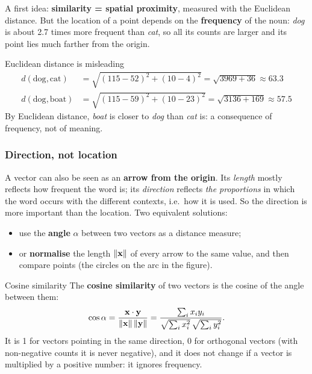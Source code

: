 A first idea: \textbf{similarity = spatial proximity}, measured with the Euclidean
distance. But the location of a point depends on the \textbf{frequency} of the noun:
\emph{dog} is about 2.7 times more frequent than \emph{cat}, so all its counts are larger
and its point lies much farther from the origin.

\begin{nbexample}{Euclidean distance is misleading}
\begin{align*}
  d(\text{dog}, \text{cat})  &= \sqrt{(115-52)^2 + (10-4)^2}  = \sqrt{3969 + 36}  \approx 63.3\\
  d(\text{dog}, \text{boat}) &= \sqrt{(115-59)^2 + (10-23)^2} = \sqrt{3136 + 169} \approx 57.5
\end{align*}
By Euclidean distance, \emph{boat} is closer to \emph{dog} than \emph{cat} is: a
consequence of frequency, not of meaning.
\end{nbexample}

\subsubsection{Direction, not location}

A vector can also be seen as an \textbf{arrow from the origin}. Its \emph{length} mostly
reflects how frequent the word is; its \emph{direction} reflects \emph{the proportions}
in which the word occurs with the different contexts, i.e.\ how it is used. So the
direction is more important than the location. Two equivalent solutions:
\begin{itemize}[nosep]
  \item use the \textbf{angle} $\alpha$ between two vectors as a distance measure;
  \item or \textbf{normalise} the length $\lVert \mathbf{x}\rVert$ of every arrow to the same
        value, and then compare points (the circles on the arc in the figure).
\end{itemize}

\begin{nbdef}{Cosine similarity}
The \textbf{cosine similarity} of two vectors is the cosine of the angle between them:
\[
  \cos\alpha = \frac{\mathbf{x}\cdot\mathbf{y}}{\lVert \mathbf{x}\rVert\,\lVert \mathbf{y}\rVert}
             = \frac{\sum_i x_i y_i}{\sqrt{\sum_i x_i^2}\,\sqrt{\sum_i y_i^2}}.
\]
It is 1 for vectors pointing in the same direction, 0 for orthogonal vectors (with
non-negative counts it is never negative), and it does not change if a vector is
multiplied by a positive number: it ignores frequency.
\end{nbdef}

